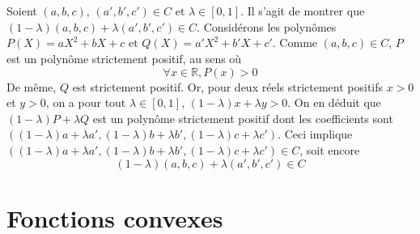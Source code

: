\documentclass{report}
\begin{document}
\subsection{} \noindent{}\\ 
\\ 
\\
\noindent Soient $(a,b,c)$, $(a',b',c')\in C$ et $\lambda \in [0,1]$.\newline
 Il s'agit de montrer que $(1-\lambda)(a,b,c) + \lambda(a',b',c')\in C$.\newline
 Considérons les polynômes $P(X)=aX^2 + bX + c$ et $Q(X)=a'X^2 + b'X + c'$. Comme $(a,b,c)\in C$, $P$ est un polynôme strictement positif, au sens où $$\forall x \in \mathbb R, P(x)>0$$
 De même, $Q$ est strictement positif.\newline \newline
 Or, pour deux réels strictement positifs $x>0$ et $y>0$, on a pour tout $\lambda \in [0,1]$, $(1-\lambda)x +\lambda y>0$. \newline \newline
 On en déduit que $(1-\lambda)P +\lambda Q$ est un polynôme strictement positif dont les coefficients  sont $((1-\lambda)a+\lambda a',(1-\lambda)b+\lambda b',(1-\lambda)c+\lambda c')$.\newline
 Ceci implique $((1-\lambda)a+\lambda a',(1-\lambda)b+\lambda b',(1-\lambda)c+\lambda c')\in C$, soit encore $$(1-\lambda)(a,b,c) + \lambda(a',b',c')\in C$$



\newpage
\section{Fonctions convexes}
\end{document}
